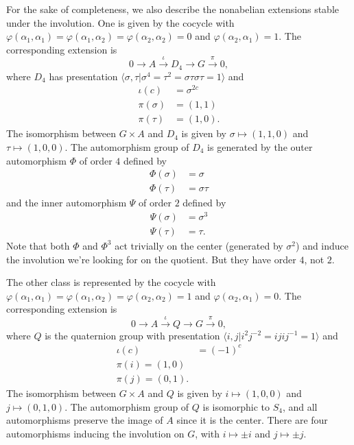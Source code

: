 \documentclass{article}
\theoremstyle{plain}
\begin{document}
For the sake of completeness, we also describe the nonabelian extensions stable under the involution.  One is given by the cocycle with $\varphi(\alpha_1,\alpha_1) = \varphi(\alpha_1, \alpha_2) = \varphi(\alpha_2, \alpha_2) = 0$ and $\varphi(\alpha_2, \alpha_1) = 1$.  The corresponding extension is
\[
0 \to A \xrightarrow{\iota} D_4 \to G \xrightarrow{\pi} 0,
\]
where $D_4$ has presentation $\langle \sigma, \tau \vert \sigma^4 = \tau^2 = \sigma\tau\sigma\tau = 1 \rangle$ and
\begin{align*}
\iota(c) &= \sigma^{2c} \\
\pi(\sigma) &= (1,1) \\
\pi(\tau) &= (1,0).
\end{align*}
The isomorphism between $G \times A$ and $D_4$ is given by $\sigma \mapsto (1,1,0)$ and $\tau \mapsto (1,0,0)$.  The automorphism group of $D_4$ is generated by the outer automorphism $\Phi$ of order $4$ defined by
\begin{align*}
\Phi(\sigma) &= \sigma \\
\Phi(\tau) &= \sigma \tau
\end{align*}
and the inner automorphism $\Psi$ of order $2$ defined by
\begin{align*}
\Psi(\sigma) &= \sigma^3 \\
\Psi(\tau) &= \tau.
\end{align*}
Note that both $\Phi$ and $\Phi^3$ act trivially on the center (generated by $\sigma^2$) and induce the involution we're looking for on the quotient.  But they have order $4$, not $2$.

The other class is represented by the cocycle with $\varphi(\alpha_1, \alpha_1) = \varphi(\alpha_1, \alpha_2) = \varphi(\alpha_2, \alpha_2) = 1$ and $\varphi(\alpha_2, \alpha_1) = 0$.  The corresponding extension is
\[
0 \to A \xrightarrow{\iota} Q \to G \xrightarrow{\pi} 0,
\]
where $Q$ is the quaternion group with presentation $\langle i, j | i^2 j^{-2} = ijij^{-1} = 1 \rangle$ and
\begin{align*}
\iota(c) &= (-1)^c \\
\pi(i) = (1,0) \\
\pi(j) = (0,1).
\end{align*}
The isomorphism between $G \times A$ and $Q$ is given by $i \mapsto (1,0,0)$ and $j \mapsto (0,1,0)$.  The automorphism group of $Q$ is isomorphic to $S_4$, and all automorphisms preserve the image of $A$ since it is the center.  There are four automorphisms inducing the involution on $G$, with $i \mapsto \pm i$ and $j \mapsto \pm j$.
\end{document}
